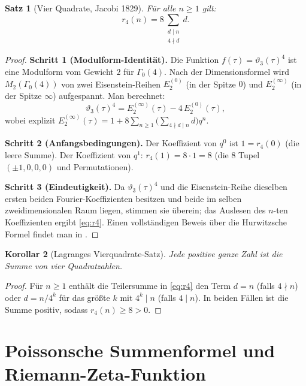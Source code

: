 \documentclass[12pt,a4paper]{amsart}
\newtheorem{theorem}{Satz}[section]
\newtheorem{corollary}[theorem]{Korollar}
\theoremstyle{definition}
\begin{document}
\begin{theorem}[Vier Quadrate, Jacobi 1829]\label{thm:r4}
Für alle $n \geq 1$ gilt:
\begin{equation}\label{eq:r4}
  r_4(n) = 8\sum_{\substack{d \mid n \\ 4 \nmid d}} d.
\end{equation}
\end{theorem}

\begin{proof}
\textbf{Schritt 1 (Modulform-Identität).}
Die Funktion $f(\tau) = \vartheta_3(\tau)^4$ ist eine Modulform vom Gewicht $2$
für $\Gamma_0(4)$.  Nach der Dimensionsformel wird $M_2(\Gamma_0(4))$ von
zwei Eisenstein-Reihen $E_2^{(0)}$ (in der Spitze $0$) und $E_2^{(\infty)}$
(in der Spitze $\infty$) aufgespannt.  Man berechnet:
\[
  \vartheta_3(\tau)^4
  = E_2^{(\infty)}(\tau) - 4\, E_2^{(0)}(\tau),
\]
wobei explizit
$E_2^{(\infty)}(\tau) = 1 + 8\sum_{n\geq1}\bigl(\sum_{4\nmid d \mid n} d\bigr) q^n$.

\textbf{Schritt 2 (Anfangsbedingungen).}
Der Koeffizient von $q^0$ ist $1 = r_4(0)$ (die leere Summe).
Der Koeffizient von $q^1$: $r_4(1) = 8\cdot 1 = 8$
(die $8$ Tupel $(\pm1,0,0,0)$ und Permutationen). \checkmark

\textbf{Schritt 3 (Eindeutigkeit).}
Da $\vartheta_3(\tau)^4$ und die Eisenstein-Reihe dieselben ersten beiden Fourier-Koeffizienten
besitzen und beide im selben zweidimensionalen Raum liegen, stimmen sie überein;
das Auslesen des $n$-ten Koeffizienten ergibt \eqref{eq:r4}.
Einen vollständigen Beweis über die Hurwitzsche Formel findet man in \cite{Grosswald1985}.
\end{proof}

\begin{corollary}[Lagranges Vierquadrate-Satz]
Jede positive ganze Zahl ist die Summe von vier Quadratzahlen.
\end{corollary}

\begin{proof}
Für $n \geq 1$ enthält die Teilersumme in \eqref{eq:r4} den Term $d = n$ (falls $4\nmid n$)
oder $d = n/4^k$ für das größte $k$ mit $4^k \mid n$ (falls $4\mid n$).
In beiden Fällen ist die Summe positiv, sodass $r_4(n) \geq 8 > 0$.
\end{proof}

\section{Poissonsche Summenformel und Riemann-Zeta-Funktion}\label{sec:poisson}
\end{document}
